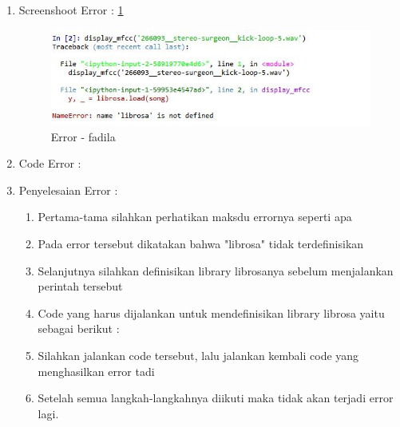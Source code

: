 \begin{enumerate}
\item Screenshoot Error : \ref{chapter-6-error-1-fadila}
\par
\begin{figure}[!hbtp]
\centering
\includegraphics[scale=0.2]{figures/chapter-6-error-1-fadila.jpg}
\caption{Error - fadila}
\label{chapter-6-error-1-fadila}
\end{figure}
\par
\par
\item Code Error :
\par

\par
\item Penyelesaian Error :
\begin{enumerate}
\item Pertama-tama silahkan perhatikan maksdu errornya seperti apa
\item Pada error tersebut dikatakan bahwa "librosa" tidak terdefinisikan
\item Selanjutnya silahkan definisikan library librosanya sebelum menjalankan perintah tersebut
\item Code yang harus dijalankan untuk mendefinisikan library librosa yaitu sebagai berikut :
\par

\par
\item Silahkan jalankan code tersebut, lalu jalankan kembali code yang menghasilkan error tadi
\item Setelah semua langkah-langkahnya diikuti maka tidak akan terjadi error lagi.
\end{enumerate}
\end{enumerate}















